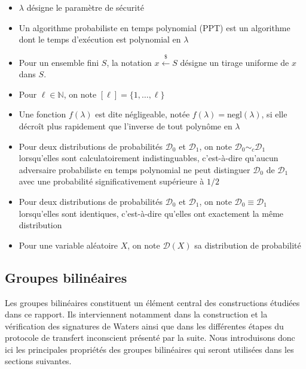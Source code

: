 \documentclass[10pt,a4paper]{article}
\theoremstyle{definition}
\theoremstyle{plain}
\theoremstyle{remark}
\newcommand{\sample}{\xleftarrow{\$}}
\newcommand{\negl}{\mathrm{negl}}
\begin{document}
\begin{itemize}
    \item $\lambda$ désigne le paramètre de sécurité
    
    \item Un algorithme probabiliste en temps polynomial (PPT) est un algorithme
    dont le temps d'exécution est polynomial en $\lambda$
    
    \item Pour un ensemble fini $S$, la notation
    $
    x \sample S
    $
    désigne un tirage uniforme de $x$ dans $S$.
    
    \item Pour $\ell\in\mathbb{N}$, on note
    $
    [\ell]=\{1,\ldots,\ell\}
    $
    
    \item Une fonction $f(\lambda)$ est dite négligeable, notée
    $f(\lambda)=\negl(\lambda)$, si elle décroît plus rapidement que
    l'inverse de tout polynôme en $\lambda$

    \item Pour deux distributions de probabilités $\mathcal{D}_0$ et
    $\mathcal{D}_1$, on note
    $
    \mathcal{D}_0 \sim_c \mathcal{D}_1
    $
    lorsqu'elles sont calculatoirement indistinguables, c'est-à-dire
    qu'aucun adversaire probabiliste en temps polynomial ne peut distinguer
    $\mathcal{D}_0$ de $\mathcal{D}_1$ avec une probabilité significativement
    supérieure à $1/2$

    \item Pour deux distributions de probabilités $\mathcal{D}_0$ et
    $\mathcal{D}_1$, on note
    $
    \mathcal{D}_0 \equiv \mathcal{D}_1
    $
    lorsqu'elles sont identiques, c'est-à-dire qu'elles ont exactement
    la même distribution

    \item Pour une variable aléatoire $X$, on note $\mathcal{D}(X)$
    sa distribution de probabilité


    
\end{itemize}

\subsection{Groupes bilinéaires}

Les groupes bilinéaires constituent un élément central des constructions
étudiées dans ce rapport. Ils interviennent notamment
dans la construction et la vérification des signatures de Waters ainsi
que dans les différentes étapes du protocole de transfert inconscient
présenté par la suite. Nous introduisons donc ici les principales
propriétés des groupes bilinéaires qui seront utilisées dans les 
sections suivantes.\\
\end{document}
